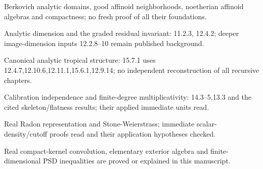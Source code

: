 \documentclass[11pt]{article}
\begin{document}
Berkovich analytic domains, good affinoid neighborhoods, noetherian affinoid algebras and compactness; no fresh proof of all their foundations.

Analytic dimension and the graded residual invariant: 11.2.3, 12.4.2; deeper image-dimension inputs 12.2.8--10 remain published background.

Canonical analytic tropical structure: 15.7.1 uses 12.4.7,12.10.6,12.11.1,15.6.1,12.9.14; no independent reconstruction of all recursive chapters.

Calibration independence and finite-degree multiplicativity: 14.3--5,13.3 and the cited skeleton/flatness results; their applied immediate units read.

Real Radon representation and Stone-Weierstrass; immediate scalar-density/cutoff proofs read and their application hypotheses checked.

Real compact-kernel convolution, elementary exterior algebra and finite-dimensional PSD inequalities are proved or explained in this manuscript.
\end{document}
